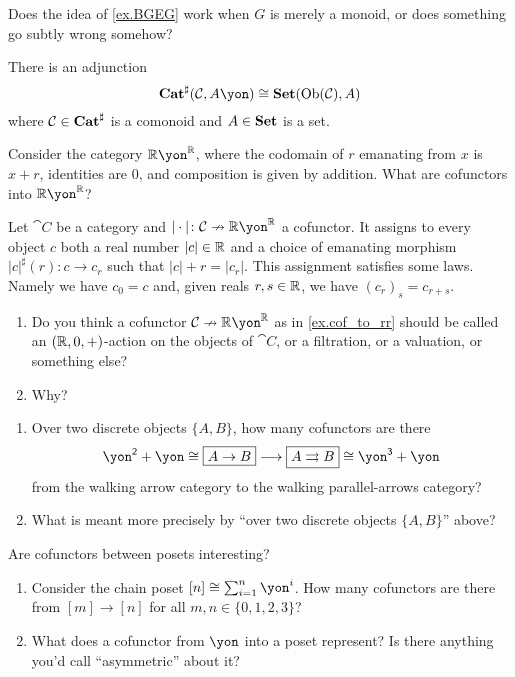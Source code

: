 \documentclass[DynamicalBook]{subfiles}
\begin{document}
\begin{exercise}\label{exc.BGEG}
Does the idea of \cref{ex.BGEG} work when $G$ is merely a monoid, or does something go subtly wrong somehow?
\end{exercise}

\begin{proposition}
There is an adjunction
\[
\smcat^\sharp(\cat{C},A\yon)\cong\smset(\Ob(\cat{C}),A)
\]
where $\mathcal{C}\in\textbf{Cat}^\sharp$ is a comonoid and $A\in\textbf{Set}$ is a set.  
\end{proposition}

\begin{example}\label{ex.cof_to_rr}
Consider the category $\rr\yon^\rr$, where the codomain of $r$ emanating from $x$ is $x+r$, identities are $0$, and composition is given by addition. What are cofunctors into $\rr\yon^\rr$?

Let $\cat{C}$ be a category and $|\cdot|\colon\cat{C}\cof\rr\yon^\rr$ a cofunctor. It assigns to every object $c$ both a real number $|c|\in\mathbb{R}$ and a choice of emanating morphism $|c|^\sharp(r)\colon c\to c_r$ such that $|c|+r=|c_r|$. This assignment satisfies some laws. Namely we have $c_0=c$ and, given reals $r,s\in\mathbb{R}$, we have $(c_r)_s=c_{r+s}$. 
\end{example}

\begin{exercise}
\begin{enumerate}
	\item Do you think a cofunctor $\cat{C}\cof\rr\yon^\rr$ as in \cref{ex.cof_to_rr} should be called an $(\mathbb{R},0,+)$-action on the objects of $\cat{C}$, or a filtration, or a valuation, or something else?
	\item Why?
\qedhere
\end{enumerate}
\end{exercise}

\begin{exercise}
\begin{enumerate}
	\item Over two discrete objects $\{A,B\}$, how many cofunctors are there
\[
\yon^\2+\yon\cong\fbox{$A\to B$}\too\fbox{$A\tto B$}\cong\yon^\3+\yon
\]
from the walking arrow category to the walking parallel-arrows category?
	\item What is meant more precisely by ``over two discrete objects $\{A,B\}$'' above?
\qedhere
\end{enumerate}
\end{exercise}

\begin{exercise}
Are cofunctors between posets interesting?
\begin{enumerate}
	\item Consider the chain poset $[n]\cong\sum_{i=1}^n\yon^i$. How many cofunctors are there from $[m]\to[n]$ for all $m,n\in\{0,1,2,3\}$?
	\item What does a cofunctor from $\yon$ into a poset represent? Is there anything you'd call ``asymmetric'' about it?
\qedhere
\end{enumerate}
\end{exercise}
\end{document}
